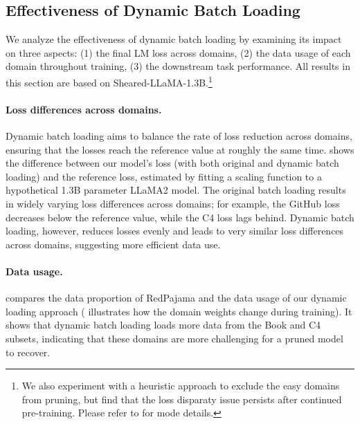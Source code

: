 \subsection{Effectiveness of Dynamic Batch Loading}
\label{sec:dynamic_loading}

We analyze the effectiveness of dynamic batch loading by examining its impact on three aspects: 
(1) the final LM loss across domains, 
(2) the data usage of each domain throughout training, 
(3) the downstream task performance. 
All results in this section are based on Sheared-LLaMA-1.3B.\footnote{We also experiment with a heuristic approach to exclude the easy domains from pruning, but find that the loss disparaty issue persists after continued pre-training. Please refer to  for mode details.}


\paragraph{Loss differences across  domains.} Dynamic batch loading aims to balance the rate of loss reduction across domains, ensuring that the losses reach the reference value at roughly the same time.  shows the difference between our model's loss (with both original and dynamic batch loading) and the reference loss, estimated by fitting a scaling function to a hypothetical 1.3B parameter LLaMA2 model. The original batch loading results in widely varying loss differences across domains; for example, the GitHub loss decreases below the reference value, while the C4 loss lags behind. Dynamic batch loading, however, reduces losses evenly and leads to very similar loss differences across domains, suggesting more efficient data use.





\paragraph{Data usage.} compares the data proportion of RedPajama and the data usage of our dynamic loading approach ( illustrates how the domain weights change during training). It shows that dynamic batch loading loads more data from the Book and C4 subsets, indicating that these domains are more challenging for a pruned model to recover.


